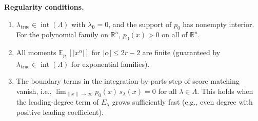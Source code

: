 \documentclass{article}
\newcommand{\R}{\mathbb{R}}
\newcommand{\E}{\mathbb{E}}
\theoremstyle{definition}
\begin{document}
\textbf{Regularity conditions.}
\begin{enumerate}[label=(R\arabic*)]
    \item \label{R1} $\lambda_{\mathrm{true}} \in \operatorname{int}(\Lambda)$
    with $\lambda_{\mathbf{0}}=0$,
    and the support of $p_0$ has nonempty interior. For the polynomial
    family on $\R^n$, $p_0(x)>0$ on all of $\R^n$.
    \item \label{R2} All moments $\E_{p_0}[|x^\alpha|]$ for $|\alpha| \le 2r-2$
    are finite (guaranteed by $\lambda_{\mathrm{true}} \in \operatorname{int}(\Lambda)$
    for exponential families).
    \item \label{R3} The boundary terms in the integration-by-parts
    step of score matching vanish, i.e.,
    $\lim_{\|x\|\to\infty} p_0(x) \, s_\lambda(x) = 0$
    for all $\lambda \in \Lambda$.
    This holds when the leading-degree term of $E_\lambda$ grows
    sufficiently fast (e.g., even degree with positive leading coefficient).
\end{enumerate}
\end{document}
